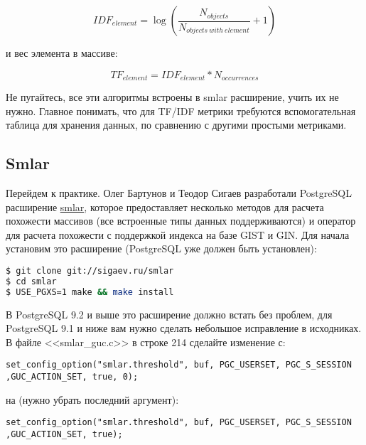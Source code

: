 \begin{equation}
 \label{eq:smlar5}
 IDF_{element} = \log{(\frac{N_{objects}}{N_{objects\ with\ element}} + 1)}
\end{equation}

и вес элемента в массиве:

\begin{equation}
 \label{eq:smlar6}
 TF_{element} = IDF_{element} * N_{occurrences}
\end{equation}

Не пугайтесь, все эти алгоритмы встроены в smlar расширение, учить их не нужно. Главное понимать, что для TF/IDF метрики требуются вспомогательная таблица для хранения данных, по сравнению с другими простыми метриками.

\subsection{Smlar}

Перейдем к практике. Олег Бартунов и Теодор Сигаев разработали PostgreSQL расширение \href{http://sigaev.ru/git/gitweb.cgi?p=smlar.git;a=blob;hb=HEAD;f=README}{smlar}, которое предоставляет несколько методов для расчета похожести массивов (все встроенные типы данных поддерживаются) и оператор для расчета похожести с поддержкой индекса на базе GIST и GIN. Для начала установим это расширение (PostgreSQL уже должен быть установлен):

\begin{lstlisting}[language=Bash,label=lst:smlar1,caption=Установка smlar]
$ git clone git://sigaev.ru/smlar
$ cd smlar
$ USE_PGXS=1 make && make install
\end{lstlisting}

В PostgreSQL 9.2 и выше это расширение должно встать без проблем, для PostgreSQL 9.1 и ниже вам нужно сделать небольшое исправление в исходниках. В файле <<smlar\_guc.c>> в строке 214 сделайте изменение с:

\begin{lstlisting}[label=lst:smlar2,caption=Фикс для 9.1 и ниже]
set_config_option("smlar.threshold", buf, PGC_USERSET, PGC_S_SESSION ,GUC_ACTION_SET, true, 0);
\end{lstlisting}

на (нужно убрать последний аргумент):

\begin{lstlisting}[label=lst:smlar3,caption=Фикс для 9.1 и ниже]
set_config_option("smlar.threshold", buf, PGC_USERSET, PGC_S_SESSION ,GUC_ACTION_SET, true);
\end{lstlisting}

